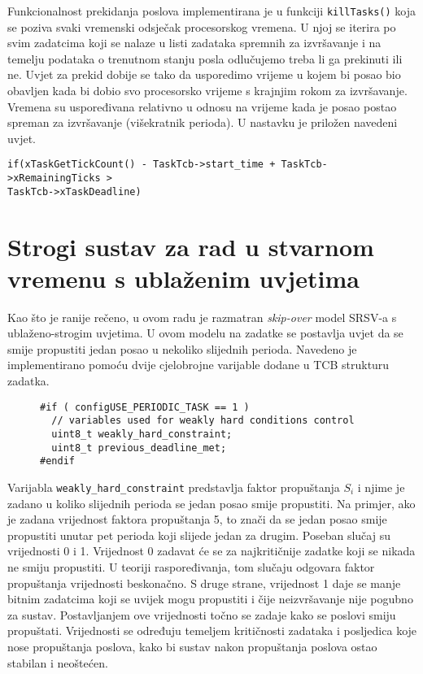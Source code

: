 \documentclass[../zavrsni.tex]{subfiles}
\begin{document}
Funkcionalnost prekidanja poslova implementirana je u funkciji \texttt{killTasks()} koja se poziva svaki vremenski 
odsječak procesorskog vremena. U njoj se iterira po svim zadatcima koji se 
nalaze u listi zadataka spremnih za izvršavanje i na temelju podataka o trenutnom stanju posla odlučujemo treba li ga prekinuti ili ne.
Uvjet za prekid dobije se tako da usporedimo vrijeme u kojem bi posao bio obavljen kada bi dobio svo procesorsko vrijeme s krajnjim rokom za izvršavanje. Vremena su uspoređivana
relativno u odnosu na vrijeme kada je posao postao spreman za izvršavanje (višekratnik perioda).
U nastavku je priložen navedeni uvjet.
\begin{lstlisting}[style=CStyle,caption={Uvjet za prekidanje izvođenja posla},captionpos=b]
if(xTaskGetTickCount() - TaskTcb->start_time + TaskTcb->xRemainingTicks > 
TaskTcb->xTaskDeadline)
\end{lstlisting}

\section{Strogi sustav za rad u stvarnom vremenu s ublaženim uvjetima}

Kao što je ranije rečeno, u ovom radu je razmatran \textit{skip-over} model SRSV-a s ublaženo-strogim uvjetima.
U ovom modelu na zadatke se postavlja uvjet da se smije propustiti jedan posao u nekoliko slijednih perioda.
Navedeno je implementirano pomoću dvije cjelobrojne varijable dodane u TCB strukturu zadatka.

\begin{figure}[h]
\centering
\begin{lstlisting}[style=CStyle,caption={Varijable dodane u strukturu za kontrolu zadataka},captionpos=b]
#if ( configUSE_PERIODIC_TASK == 1 )
  // variables used for weakly hard conditions control
  uint8_t weakly_hard_constraint;
  uint8_t previous_deadline_met;
#endif
\end{lstlisting}
\end{figure}

Varijabla \texttt{weakly\_hard\_constraint} predstavlja faktor propuštanja $S_i$ i njime je zadano u koliko slijednih perioda se jedan posao smije propustiti.
Na primjer, ako je zadana vrijednost faktora propuštanja 5, to znači da se jedan posao smije propustiti unutar pet perioda 
koji slijede jedan za drugim.
Poseban slučaj su vrijednosti 0 i 1. Vrijednost 0 zadavat će se za najkritičnije zadatke koji se nikada ne smiju propustiti. 
U teoriji raspoređivanja, tom slučaju odgovara faktor propuštanja vrijednosti beskonačno.
S druge strane, vrijednost 1 daje se manje bitnim zadatcima koji se uvijek mogu propustiti i čije neizvršavanje nije pogubno za sustav.
Postavljanjem ove vrijednosti točno se zadaje kako se poslovi smiju propuštati. Vrijednosti se određuju 
temeljem kritičnosti zadataka i posljedica koje nose propuštanja poslova, kako bi sustav nakon propuštanja poslova ostao 
stabilan i neoštećen.
\end{document}
